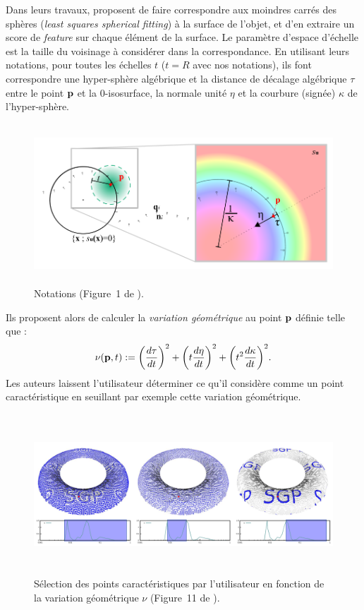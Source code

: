 Dans leurs travaux,  proposent de faire
correspondre aux moindres carrés des sphères (\emph{least squares spherical
fitting}) à la surface de l'objet, et d'en extraire un score de \emph{feature}
sur chaque élément de la surface. Le paramètre d'espace d'échelle est la taille
du voisinage à considérer dans la correspondance. En utilisant leurs notations,
pour toutes les échelles $t$ ($t=R$ avec nos notations), ils font correspondre
une hyper-sphère algébrique et la distance de décalage algébrique $\tau$ entre
le point $\mathbf{p}$ et la $0$-isosurface, la normale unité $\eta$ et la courbure
(signée) $\kappa$ de l'hyper-sphère.
%
\begin{figure}[ht]{
    \begin{center}
    \includegraphics[height=6cm]{images/Feature/Mellado_notations}
    \end{center}}
    \caption[Notations.]{Notations (Figure~1 de \cite{Mellado2012}).
      \label{fig:mellado-notations}}
\end{figure}
%
Ils proposent alors de calculer la \emph{variation géométrique} au point $\mathbf{p}$
définie telle que :
%
\begin{equation}
  \nu(\mathbf{p},t) :=
  {\left(
    \frac{d\tau}{dt} \right)}^2
    + {\left( t\frac{d\eta}{dt}
  \right)}^2
  + {\left( t^2\frac{d\kappa}{dt} \right)}^2.
\end{equation}
%
Les auteurs laissent l'utilisateur déterminer ce qu'il considère comme un point
caractéristique en seuillant par exemple cette variation géométrique.
%
\begin{figure}[ht]{
    \begin{center}
    \includegraphics[height=6cm]{images/Feature/Mellado_multiscale}
    \end{center}}
    \caption[Sélection des points caractéristiques par l'utilisateur.]{Sélection des points caractéristiques par l'utilisateur en fonction de la variation géométrique $\nu$ (Figure~11 de \cite{Mellado2012}).
      \label{fig:mellado-multiscale}}
\end{figure}
